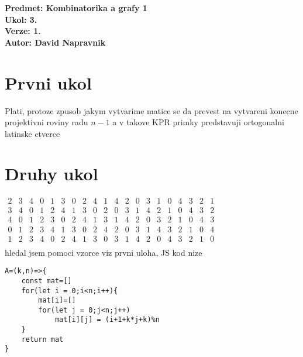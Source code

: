 \documentclass[a4paper]{article}
\begin{document}
\noindent
\textbf{Predmet: Kombinatorika a grafy 1}\\
\textbf{Ukol: 3.}\\
\textbf{Verze: 1.}\\
\textbf{Autor: David Napravnik}

\section*{Prvni ukol}
Plati, protoze zpusob jakym vytvarime matice se da prevest na vytvareni konecne projektivni roviny radu $n-1$ a v  takove KPR primky predstavuji ortogonalni latinske ctverce




\section*{Druhy ukol}
$
\begin{matrix}
	2 & 3 & 4 & 0 & 1 \\
	3 & 4 & 0 & 1 & 2 \\
	4 & 0 & 1 & 2 & 3 \\
	0 & 1 & 2 & 3 & 4 \\
	1 & 2 & 3 & 4 & 0 \\
\end{matrix}
$\hspace{30pt}$
\begin{matrix}
	3 & 0 & 2 & 4 & 1 \\
	4 & 1 & 3 & 0 & 2 \\
	0 & 2 & 4 & 1 & 3 \\
	1 & 3 & 0 & 2 & 4 \\
	2 & 4 & 1 & 3 & 0 \\
\end{matrix}
$\hspace{30pt}$
\begin{matrix}
	4 & 2 & 0 & 3 & 1 \\
	0 & 3 & 1 & 4 & 2 \\
	1 & 4 & 2 & 0 & 3 \\
	2 & 0 & 3 & 1 & 4 \\
	3 & 1 & 4 & 2 & 0 \\
\end{matrix}
$\hspace{30pt}$
\begin{matrix}
	0 & 4 & 3 & 2 & 1 \\
	1 & 0 & 4 & 3 & 2 \\
	2 & 1 & 0 & 4 & 3 \\
	3 & 2 & 1 & 0 & 4 \\
	4 & 3 & 2 & 1 & 0 \\
\end{matrix}
$
\\
hledal jsem pomoci vzorce viz prvni uloha, JS kod nize
\begin{verbatim}
A=(k,n)=>{
    const mat=[]
    for(let i = 0;i<n;i++){
        mat[i]=[]
        for(let j = 0;j<n;j++)
            mat[i][j] = (i+1+k*j+k)%n
    }
    return mat
}
\end{verbatim}
\end{document}
